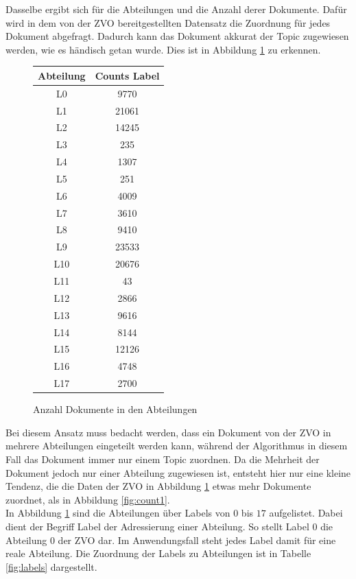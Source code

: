 \documentclass[german,version-2020-11]{uzl-thesis}
\begin{document}
Dasselbe ergibt sich für die Abteilungen und die Anzahl derer Dokumente. Dafür wird in dem von der ZVO bereitgestellten Datensatz die Zuordnung für jedes Dokument abgefragt. Dadurch kann das Dokument akkurat der Topic zugewiesen werden, wie es händisch getan wurde. Dies ist in Abbildung \ref{fig:count2} zu erkennen. \\ 

\begin{figure}[H]
\begin{center}
\begin{tabular}{cc}
\hline
\hline
Abteilung & Counts Label\\
\hline
L0&9770\\
L1&21061\\
L2&14245\\
L3&235\\
L4&1307\\
L5&251\\
L6&4009\\
L7&3610\\
L8&9410\\
L9&23533\\
L10&20676\\
L11&43\\
L12&2866\\
L13&9616\\
L14&8144\\
L15&12126\\
L16&4748\\
L17&2700\\
\hline
\hline
\end{tabular}
\caption{Anzahl Dokumente in den Abteilungen}
\label{fig:count2}
\end{center}
\end{figure}

Bei diesem Ansatz muss bedacht werden, dass ein Dokument von der ZVO in mehrere Abteilungen eingeteilt werden kann, während der Algorithmus in diesem Fall das Dokument immer nur einem Topic zuordnen. Da die Mehrheit der Dokument jedoch nur einer Abteilung zugewiesen ist, entsteht hier nur eine kleine Tendenz, die die Daten der ZVO in Abbildung \ref{fig:count2} etwas mehr Dokumente zuordnet, als in Abbildung \ref{fig:count1}.\\

In Abbildung \ref{fig:count2} sind die Abteilungen über Labels von $0$ bis $17$ aufgelistet. Dabei dient der Begriff Label der Adressierung einer Abteilung. So stellt Label 0 die Abteilung 0 der ZVO dar. Im Anwendungsfall steht jedes Label damit für eine reale Abteilung. Die Zuordnung der Labels zu Abteilungen ist in Tabelle \ref{fig:labels} dargestellt.
\end{document}
